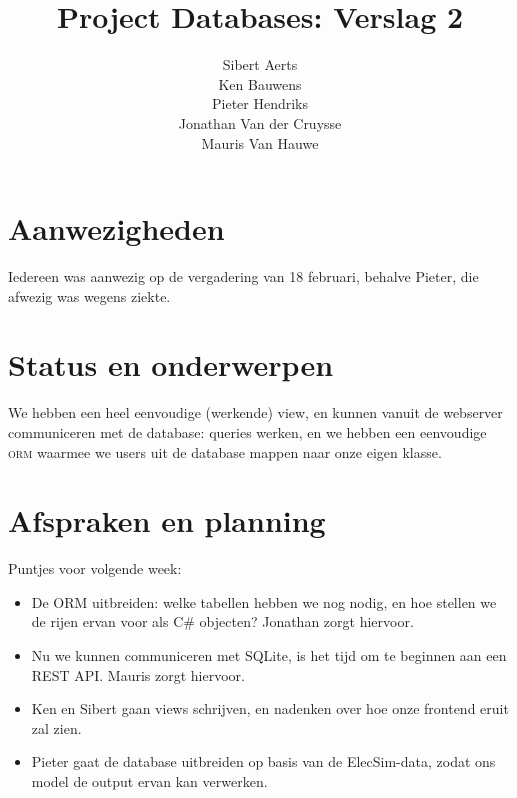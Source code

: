 \documentclass[10pt,a4paper]{article}
\author{Sibert Aerts\\
Ken Bauwens\\
Pieter Hendriks\\
Jonathan Van der Cruysse\\
Mauris Van Hauwe}
\title{Project Databases: Verslag 2}
\begin{document}
  \maketitle
  \section{Aanwezigheden}
  Iedereen was aanwezig op de vergadering van 18 februari, behalve Pieter, die 
  afwezig was wegens ziekte.
  
  \section{Status en onderwerpen}
  We hebben een heel eenvoudige (werkende) view, en kunnen vanuit de webserver
  communiceren met de database: queries werken, en we hebben een eenvoudige
  \textsc{orm} waarmee we users uit de database mappen naar onze eigen klasse.
  
  \section{Afspraken en planning}
  Puntjes voor volgende week:
  \begin{itemize}
    \item De ORM uitbreiden: welke tabellen hebben we 
    nog nodig, en hoe stellen we de rijen ervan voor als C\# objecten? Jonathan 
    zorgt hiervoor.
    \item Nu we kunnen communiceren met SQLite, is het tijd om te beginnen aan 
    een REST API. Mauris zorgt hiervoor.
    \item Ken en Sibert gaan views schrijven, en nadenken over hoe onze 
    frontend eruit zal zien.
    \item Pieter gaat de database uitbreiden op basis van de ElecSim-data, 
    zodat ons model de output ervan kan verwerken.
  \end{itemize}
\end{document}
